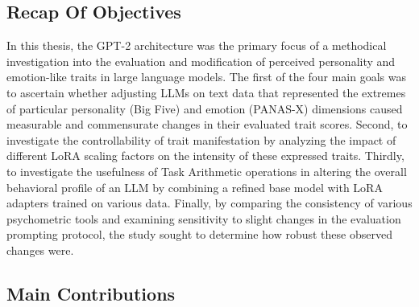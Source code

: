 \documentclass{DESSThesis}
\begin{document}
\subsection{Recap Of Objectives}
In this thesis, the GPT-2 architecture was the primary focus of a methodical investigation into the evaluation and modification of perceived personality and emotion-like traits in large language models. The first of the four main goals was to ascertain whether adjusting LLMs on text data that represented the extremes of particular personality (Big Five) and emotion (PANAS-X) dimensions caused measurable and commensurate changes in their evaluated trait scores. Second, to investigate the controllability of trait manifestation by analyzing the impact of different LoRA scaling factors on the intensity of these expressed traits. Thirdly, to investigate the usefulness of Task Arithmetic operations in altering the overall behavioral profile of an LLM by combining a refined base model with LoRA adapters trained on various data. Finally, by comparing the consistency of various psychometric tools and examining sensitivity to slight changes in the evaluation prompting protocol, the study sought to determine how robust these observed changes were.

\subsection{Main Contributions}
\end{document}
